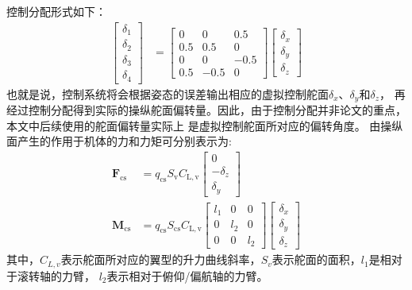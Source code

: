 控制分配形式如下：
\begin{align}
    \left[\begin{array}{l}
    \delta_{1} \\
    \delta_{2} \\
    \delta_{3} \\
    \delta_{4}
    \end{array}\right] & = \left[\begin{array}{ccc}
    0 & 0 & 0.5 \\
    0.5 & 0.5 & 0 \\
    0 & 0 & -0.5 \\
    0.5 & -0.5 & 0
    \end{array}\right]\left[\begin{array}{l}
    \delta_{x} \\
    \delta_{y} \\
    \delta_{z}
    \end{array}\right]
\end{align}
也就是说，控制系统将会根据姿态的误差输出相应的虚拟控制舵面$\delta_{x}$、$\delta_{y}$和$\delta_{z}$，
再经过控制分配得到实际的操纵舵面偏转量。因此，由于控制分配并非论文的重点，本文中后续使用的舵面偏转量实际上
是虚拟控制舵面所对应的偏转角度。
由操纵面产生的作用于机体的力和力矩可分别表示为:
\begin{align}
    \mathbf{F}_{\mathrm{cs}} & = q_{\mathrm{cs}} S_{\mathrm{v}} C_{\mathrm{L,v}}\left[\begin{array}{c}
    0\\
    -\delta_{z}  \\
    \delta_{y} 
    \end{array}\right] \\
    \mathbf{M}_{\mathrm{cs}} & = q_{\mathrm{cs}} S_{\mathrm{cs}} C_{\mathrm{L,v}}\left[\begin{array}{ccc}
    l_{1} & 0 & 0 \\
    0 & l_{2} & 0 \\
    0 & 0 & l_{2}
    \end{array}\right]\left[\begin{array}{c}
    \delta_{x} \\
    \delta_{y} \\
    \delta_{z}
    \end{array}\right]
\end{align}
其中，$C_{L,v}$表示舵面所对应的翼型的升力曲线斜率，$S_{v}$表示舵面的面积，$l_{1}$是相对于滚转轴的力臂，
$l_{2}$表示相对于俯仰/偏航轴的力臂。

